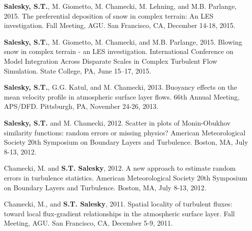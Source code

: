 \documentclass[11pt,letterpaper]{article}
\begin{document}


\textbf{Salesky, S.T.}, M. Giometto, M. Chamecki, M. Lehning, and M.B.
Parlange, 2015. The preferential deposition of snow in complex terrain: An LES
investigation. Fall Meeting, AGU. San Francisco, CA, December 14-18, 2015.

\textbf{Salesky, S.T.}, M. Giometto, M. Chamecki, and M.B. Parlange, 2015.
Blowing snow in complex terrain - an LES investigation. International
Conference on Model Integration Across Disparate Scales in Complex Turbulent
Flow Simulation. State College, PA, June 15--17, 2015. 


\textbf{Salesky, S.T.}, G.G. Katul, and M. Chamecki, 2013. Buoyancy effects on
the mean velocity profile in atmospheric surface layer flows. 66th Annual
Meeting, APS/DFD. Pittsburgh, PA, November 24-26, 2013. 

\textbf{Salesky, S.T.} and M. Chamecki, 2012. Scatter in plots of Monin-Obukhov
similarity functions: random errors or missing physics? American Meteorological
Society 20th Symposium on Boundary Layers and Turbulence. Boston, MA, July
8-13, 2012. 

Chamecki, M. and \textbf{S.T. Salesky}, 2012. A new approach to estimate random
errors in turbulence statistics. American Meteorological Society 20th Symposium
on Boundary Layers and Turbulence. Boston, MA, July 8-13, 2012. 

Chamecki, M., and \textbf{S.T. Salesky}, 2011. Spatial locality of turbulent
fluxes: toward local flux-gradient relationships in the atmospheric surface
layer. Fall Meeting, AGU. San Francisco, CA, December 5-9, 2011. 
\end{document}
